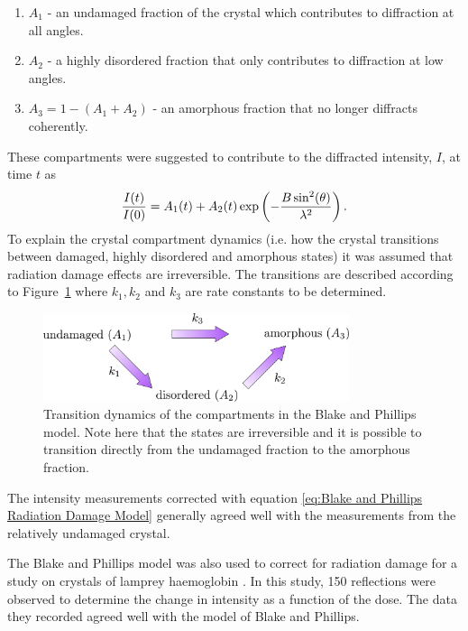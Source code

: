         \begin{enumerate}
            \item $A_1$ - an undamaged fraction of the crystal which contributes to diffraction at all angles.
            \item $A_2$ - a highly disordered fraction that only contributes to diffraction at low angles.
            \item $A_3 = 1 - (A_1 + A_2)$ - an amorphous fraction that no longer diffracts coherently.
        \end{enumerate}
        These compartments were suggested to contribute to the diffracted intensity, $I$, at time $t$ as
        \begin{equation}
            \frac{I(t)}{I(0)} = A_1(t) + A_2(t) \exp\left(-\frac{B\sin^2(\theta)}{\lambda^2} \right).
            \label{eq:Blake and Phillips Radiation Damage Model}
        \end{equation}
        To explain the crystal compartment dynamics (i.e. how the crystal transitions between damaged, highly disordered and amorphous states) it was assumed that radiation damage effects are irreversible. The transitions are described according to Figure~\ref{fig:Crystal Compartments Blake and Phillips} where $k_1, k_2$ and $k_3$ are rate constants to be determined.
        \begin{figure}[H]
            \centering
            \includegraphics[width=0.8\textwidth]{figures/introduction/crystalcompartments_BP.pdf}
            \caption{Transition dynamics of the compartments in the Blake and Phillips model. Note here that the states are irreversible and it is possible to transition directly from the undamaged fraction to the amorphous fraction.}
            \label{fig:Crystal Compartments Blake and Phillips}
        \end{figure}
        The intensity measurements corrected with equation \ref{eq:Blake and Phillips Radiation Damage Model} generally agreed well with the measurements from the relatively undamaged crystal.

        The Blake and Phillips model was also used to correct for radiation damage for a study on crystals of lamprey haemoglobin \cite{hendrickson1973}. In this study, 150 reflections were observed to determine the change in intensity as a function of the dose. The data they recorded agreed well with the model of Blake and Phillips.

